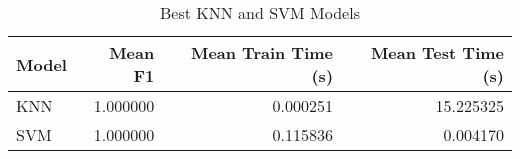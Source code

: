 \begin{table}
\centering
\caption{Best KNN and SVM Models}
\label{tab:best_knn_and_svm_summary_mushroom}
\begin{tabular}{lrrr}
\toprule
Model & Mean F1 & Mean Train Time (s) & Mean Test Time (s) \\
\midrule
KNN & 1.000000 & 0.000251 & 15.225325 \\
SVM & 1.000000 & 0.115836 & 0.004170 \\
\bottomrule
\end{tabular}
\end{table}
